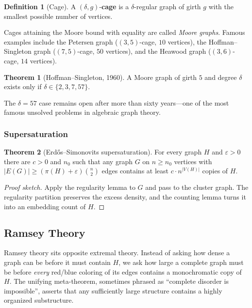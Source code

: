\documentclass{article}
\theoremstyle{definition}
\newtheorem{theorem}{Theorem}
\newtheorem{definition}{Definition}
\begin{document}
\begin{definition}[Cage]
A $(\delta, g)$-\textbf{cage} is a $\delta$-regular graph of girth
$g$ with the smallest possible number of vertices.
\end{definition}

Cages attaining the Moore bound with equality are called
\emph{Moore graphs}. Famous examples include the Petersen graph
($(3, 5)$-cage, $10$ vertices), the Hoffman--Singleton graph
($(7, 5)$-cage, $50$ vertices), and the Heawood graph ($(3, 6)$-cage,
$14$ vertices).

\begin{theorem}[Hoffman--Singleton, 1960]
A Moore graph of girth $5$ and degree $\delta$ exists only if
$\delta \in \{2, 3, 7, 57\}$.
\end{theorem}

The $\delta = 57$ case remains open after more than sixty years---one
of the most famous unsolved problems in algebraic graph theory.

\subsubsection{Supersaturation}

\begin{theorem}[Erd\H{o}s--Simonovits supersaturation]
For every graph $H$ and $\varepsilon > 0$ there are $c > 0$ and $n_0$ such
that any graph $G$ on $n \ge n_0$ vertices with
$|E(G)| \ge (\pi(H) + \varepsilon) \binom{n}{2}$
edges contains at least $c \cdot n^{|V(H)|}$ copies of $H$.
\end{theorem}

\begin{proof}[Proof sketch]
Apply the regularity lemma to $G$ and pass to the cluster graph.
The regularity partition preserves the excess density, and the
counting lemma turns it into an embedding count of $H$.
\end{proof}

\subsection{Ramsey Theory}

Ramsey theory sits opposite extremal theory. Instead of asking how
dense a graph can be before it must contain $H$, we ask how large a
complete graph must be before \emph{every} red/blue coloring of its
edges contains a monochromatic copy of $H$. The unifying meta-theorem,
sometimes phrased as ``complete disorder is impossible'', asserts
that any sufficiently large structure contains a highly organized
substructure.
\end{document}
